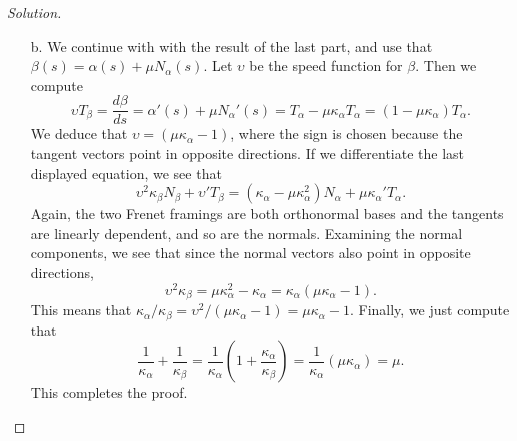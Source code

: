 \documentclass[Shifrin_Solutions_Spring_2018]{subfiles}
\begin{document}
\begin{proof}[Solution]
\begin{itemize}
\item[b.] We continue with with the result of the last part, and use that 
$\beta(s) = \alpha(s) + \mu N_{\alpha}(s)$. Let $\upsilon$ be the speed function for 
$\beta$. Then we compute
\[
\upsilon T_{\beta} = \dfrac{d\beta}{ds} = \alpha'(s) + \mu N_{\alpha}'(s) 
= T_{\alpha} -\mu\kappa_{\alpha}T_{\alpha}  = (1 - \mu \kappa_{\alpha} ) T_{\alpha}.
\]
We deduce that  $\upsilon = (\mu \kappa_{\alpha} - 1)$, where the sign is chosen because 
the tangent vectors point in opposite directions.  If we differentiate the last displayed 
equation, we see that
\[
\upsilon^2 \kappa_{\beta} N_{\beta} + \upsilon' T_{\beta} = (\kappa_{\alpha} 
- \mu \kappa_{\alpha}^2) N_{\alpha} + \mu \kappa_{\alpha}' T_{\alpha} .
\]
Again, the two Frenet framings are both orthonormal bases and the tangents are linearly 
dependent, and so are the normals. Examining the normal components, we see that  since 
the normal vectors also point in opposite directions,
\[
\upsilon^2 \kappa_{\beta} = \mu \kappa_{\alpha}^2 - \kappa_{\alpha} 
= \kappa_{\alpha} ( \mu \kappa_{\alpha} - 1) .
\]
This means that $\kappa_{\alpha}/\kappa_{\beta} = \upsilon^2 / (\mu \kappa_{\alpha} - 1) 
= \mu \kappa_{\alpha} - 1$. Finally, we just compute that
\[
\dfrac{1}{\kappa_{\alpha}} + \dfrac{1}{\kappa_{\beta}} 
= \dfrac{1}{\kappa_{\alpha}} \left( 1 + \dfrac{\kappa_{\alpha}}{\kappa_{\beta}} \right) 
= \dfrac{1}{\kappa_{\alpha}} ( \mu \kappa_{\alpha} ) = \mu .
\]
This completes the proof.
\end{itemize}
\end{proof}

\clearpage

\end{document}
